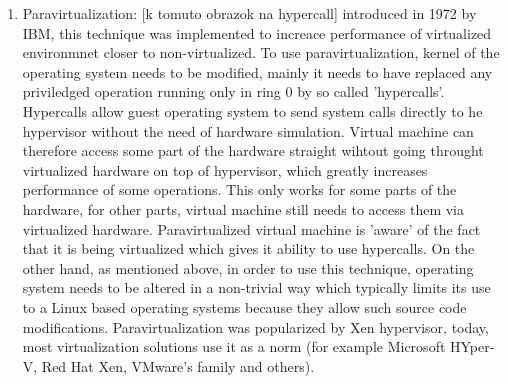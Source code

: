 \begin{enumerate}
\item Paravirtualization: [k tomuto obrazok na hypercall] introduced in 1972 by IBM, this technique was implemented to increace performance of virtualized environmnet closer to non-virtualized. To use paravirtualization, kernel of the operating system needs to be modified, mainly it needs to have replaced any priviledged operation running only in ring 0 by so called 'hypercalls'. Hypercalls allow guest operating system to send system calls directly to he hypervisor without the need of hardware simulation. Virtual machine can therefore access some part of the hardware straight wihtout going throught virtualized hardware on top of hypervisor, which greatly increases performance of some operations. This only works for some parts of the hardware, for other parts, virtual machine still needs to access them via virtualized hardware. Paravirtualized virtual machine is 'aware' of the fact that it is being virtualized which gives it ability to use hypercalls. On the other hand, as mentioned above, in order to use this technique, operating system needs to be altered in a non-trivial way which typically limits its use to a Linux based operating systems because they allow such source code modifications.
Paravirtualization was popularized by Xen hypervisor, today, most virtualization solutions use it as a norm (for example Microsoft HYper-V, Red Hat Xen, VMware's family and others).


\end{enumerate}

